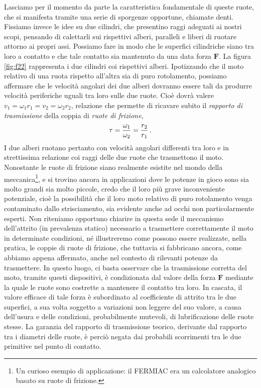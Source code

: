 \noindent Lasciamo per il momento da parte la caratteristica fondamentale di queste
ruote, che si manifesta tramite una serie di sporgenze opportune, chiamate denti.
Fissiamo invece 
le idee su due cilindri, che presentino raggi adeguati ai nostri
scopi, pensando di calettarli sui
rispettivi alberi, paralleli e liberi di ruotare attorno ai propri assi.
Possiamo fare in modo che le superfici cilindriche siano tra loro
a contatto e che tale contatto sia mantenuto da una data forza $\bm F$.
La figura \ref{fig:f22} rappresenta i due cilindri coi rispettivi alberi.
Ipotizzando che il moto relativo di una ruota rispetto all'altra sia di puro
rotolamento, possiamo affermare che le velocit\`a angolari dei due alberi
dovranno essere tali da produrre velocit\`a periferiche uguali
tra loro sulle due ruote.
Cio\`e dovr\`a valere $v_1=\omega_1 r_1 = v_2 = \omega_2 r_2$, 
relazione che permette di ricavare subito il {\em rapporto di trasmissione} della coppia di 
{\em ruote di frizione},
\begin{equation}
\tau={\omega_1\over{\omega_2}}=
{{r_2}\over{r_1}}\,.
\label{eq:tau}
\end{equation}
\noindent I due alberi ruotano pertanto con velocit\`a angolari differenti tra
loro e in strettissima relazione coi raggi delle due ruote che trasmettono
il moto. Nonostante le ruote di frizione siano realmente esistite nel
mondo della meccanica\footnote
{
Un curioso esempio di applicazione: il FERMIAC era un calcolatore analogico basato su ruote di frizione.
}, e si trovino ancora in applicazioni dove le
potenze in gioco sono sia molto grandi sia molto piccole, credo che il
loro pi\`u grave inconveniente potenziale, cio\`e
la possibilit\`a che il loro moto relativo di puro rotolamento venga
contaminato dallo strisciamento, sia evidente anche ad occhi non
particolarmente esperti. Non riteniamo opportuno chiarire
in questa sede il  meccanismo dell'attrito (in prevalenza statico)
necessario a trasmettere correttamente il moto in determinate condizioni,
n\'e illustreremo come possono essere realizzate, nella pratica, le coppie
di ruote di frizione, che tuttavia si fabbricano ancora, come
abbiamo appena affermato, anche
nel contesto di rilevanti potenze da trasmettere.
In questo luogo, ci basta osservare che
la trasmissione corretta del moto, tramite questi dispositivi,
\`e condizionata dal valore della forza $\bm F$ mediante la quale
le ruote sono costrette a mantenere il contatto tra loro.
In cascata, il valore efficace di tale forza \`e subordinato
al coefficiente di attrito tra le due superfici, a sua volta soggetto
a variazioni non leggere del suo valore,
a causa dell'usura e delle condizioni, probabilmente mutevoli, di
lubrificazione delle ruote stesse.
La garanzia del rapporto di trasmissione teorico, derivante dal rapporto tra i
diametri delle ruote, \`e perci\`o negata dai probabili scorrimenti
tra le due primitive nel punto di contatto.


